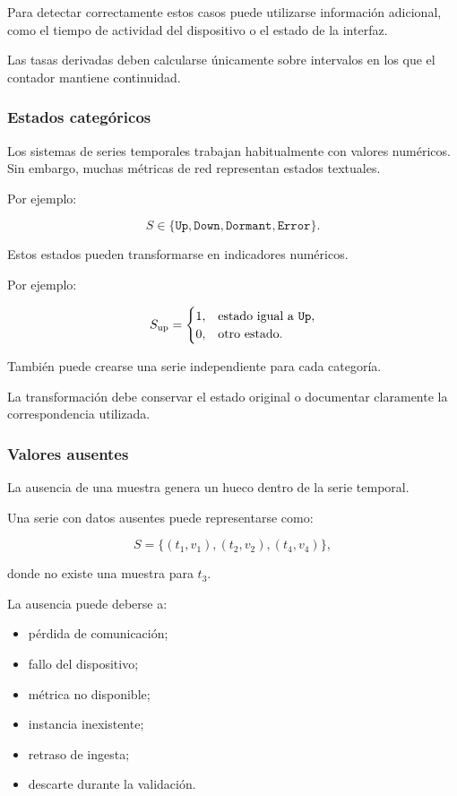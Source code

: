 Para detectar correctamente estos casos puede utilizarse información
adicional, como el tiempo de actividad del dispositivo o el estado de la
interfaz.

Las tasas derivadas deben calcularse únicamente sobre intervalos en los
que el contador mantiene continuidad.


\subsubsection*{Estados categóricos}

Los sistemas de series temporales trabajan habitualmente con valores
numéricos. Sin embargo, muchas métricas de red representan estados
textuales.

Por ejemplo:

\[
    S
    \in
    \{
        \texttt{Up},
        \texttt{Down},
        \texttt{Dormant},
        \texttt{Error}
    \}.
\]

Estos estados pueden transformarse en indicadores numéricos.

Por ejemplo:

\[
    S_{\mathrm{up}}
    =
    \begin{cases}
        1, & \text{estado igual a \texttt{Up}},\\
        0, & \text{otro estado}.
    \end{cases}
\]

También puede crearse una serie independiente para cada categoría.

La transformación debe conservar el estado original o documentar
claramente la correspondencia utilizada.


\subsubsection*{Valores ausentes}

La ausencia de una muestra genera un hueco dentro de la serie temporal.

Una serie con datos ausentes puede representarse como:

\[
    S
    =
    \{
        (t_1,v_1),
        (t_2,v_2),
        (t_4,v_4)
    \},
\]

donde no existe una muestra para \(t_3\).

La ausencia puede deberse a:

\begin{itemize}
    \item pérdida de comunicación;

    \item fallo del dispositivo;

    \item métrica no disponible;

    \item instancia inexistente;

    \item retraso de ingesta;

    \item descarte durante la validación.
\end{itemize}

